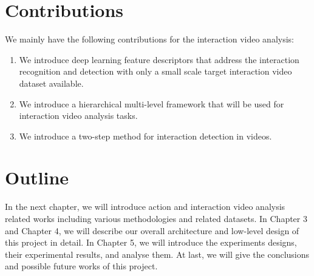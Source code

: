 \section{Contributions}
\label{sec:intro_sec03}

We mainly have the following contributions for the interaction video analysis: 
\begin{enumerate}
	\item We introduce deep learning feature descriptors that address the interaction recognition and detection with only a small scale target interaction video dataset available. 
	\item We introduce a hierarchical multi-level framework that will be used for interaction video analysis tasks.
	\item We introduce a two-step method for interaction detection in videos.
\end{enumerate}

\section{Outline}
\label{sec:intro_outline}
In the next chapter, we will introduce action and interaction video analysis related works including various methodologies and related datasets. In Chapter 3 and Chapter 4, we will describe our overall architecture and low-level design of this project in detail. In Chapter 5, we will introduce the experiments designs, their experimental results, and analyse them. At last, we will give the conclusions and possible future works of this project.
